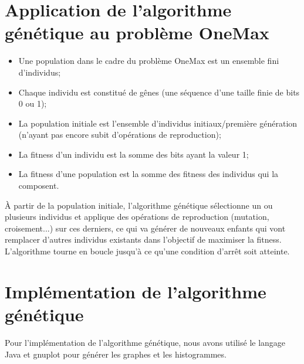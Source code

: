 \documentclass[12pt]{article}
\begin{document}
\section{Application de l'algorithme génétique au problème OneMax}
\begin{itemize}[label=-]
\item Une population dans le cadre du problème OneMax est un ensemble fini d'individus;
\item Chaque individu est constitué de gênes (une séquence d'une taille finie de bits 0 ou 1);
\item La population initiale est l'ensemble d'individus initiaux/première génération (n'ayant pas encore subit d'opérations de reproduction);
\item La fitness d'un individu est la somme des bits ayant la valeur 1;
\item La fitness d'une population est la somme des fitness des individus qui la composent.
\end{itemize}

\par À partir de la population initiale, l'algorithme génétique sélectionne un ou plusieurs individus et applique des opérations de reproduction (mutation, croisement...) sur ces derniers, ce qui va générer de nouveaux enfants qui vont remplacer d'autres individus existants dans l'objectif de maximiser la fitness. L'algorithme tourne en boucle jusqu'à ce qu'une condition d'arrêt soit atteinte. 

\section{Implémentation de l'algorithme génétique}
Pour l'implémentation de l'algorithme génétique, nous avons utilisé le langage Java et gnuplot pour générer les graphes et les histogrammes.
\end{document}
